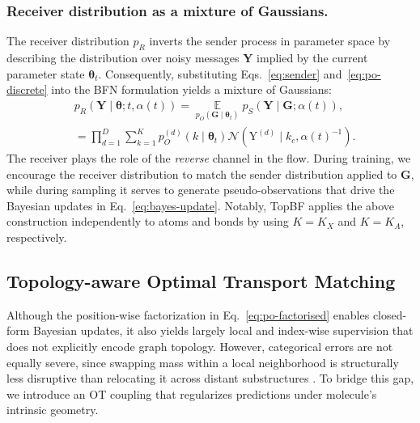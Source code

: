 \documentclass[journal,twoside,web]{ieeecolor}
\begin{document}
\subsubsection{Receiver distribution as a mixture of Gaussians.}
The receiver distribution $p_R$ inverts the sender process in parameter space by describing the distribution over noisy messages $\mathbf{Y}$ implied by the current parameter state $\boldsymbol{\theta}_t$. Consequently, substituting Eqs.~\eqref{eq:sender} and~\eqref{eq:po-discrete} into the BFN formulation yields a mixture of Gaussians:
\begin{equation}
    \begin{aligned}
        & p_R(\mathbf{Y} \mid \boldsymbol{\theta}; t, \alpha(t)) = \mathop{\mathbb{E}}\limits_{p_O(\mathbf{G} \mid \boldsymbol{\theta}_t)} p_S(\mathbf{Y} \mid \mathbf{G}; \alpha(t)), \\
        & = \prod_{d=1}^D \sum_{k=1}^{K}p_O^{(d)}(k \mid \boldsymbol{\theta}_t) \mathcal{N}(\mathrm{Y}^{(d)} \mid k_c, \alpha(t)^{-1}).
    \end{aligned}
\label{eq:receiver-discrete}
\end{equation}
The receiver plays the role of the \emph{reverse} channel in the flow. During training, we encourage the receiver distribution to match the sender distribution applied to $\mathbf{G}$, while during sampling it serves to generate pseudo-observations that drive the Bayesian updates in Eq.~\eqref{eq:bayes-update}. Notably, TopBF applies the above construction independently to atoms and bonds by using $K = K_X$ and $K = K_A$, respectively.


\subsection{Topology-aware Optimal Transport Matching}
\label{sec:topo_ot}

Although the position-wise factorization in Eq.~\eqref{eq:po-factorised} enables closed-form Bayesian updates, it also yields largely local and index-wise supervision that does not explicitly encode graph topology. However, categorical errors are not equally severe, since swapping mass within a local neighborhood is structurally less disruptive than relocating it across distant substructures \cite{frogner2015learning,cheng2024quasi}. To bridge this gap, we introduce an OT coupling that regularizes predictions under molecule's intrinsic geometry.
\end{document}

